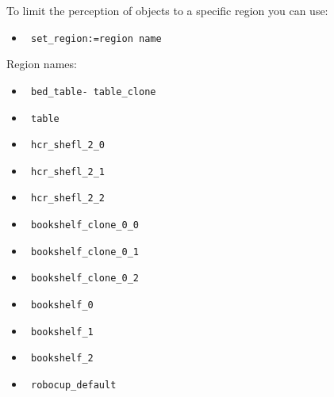 \documentclass[main.tex]{subfiles}
\begin{document}
To limit the perception of objects to a specific region you can use:\\
\begin{itemize}
\item \begin{verbatim} set_region:=region name \end{verbatim} 
\end{itemize}
Region names:\\
\begin{itemize}
\item \begin{verbatim} bed_table- table_clone \end{verbatim} 
\item \begin{verbatim} table \end{verbatim} 
\item \begin{verbatim} hcr_shefl_2_0 \end{verbatim} 
\item \begin{verbatim} hcr_shefl_2_1 \end{verbatim}
\item \begin{verbatim} hcr_shefl_2_2 \end{verbatim}
\item \begin{verbatim} bookshelf_clone_0_0 \end{verbatim} 
\item \begin{verbatim} bookshelf_clone_0_1 \end{verbatim} 
\item \begin{verbatim} bookshelf_clone_0_2 \end{verbatim} 
\item \begin{verbatim} bookshelf_0 \end{verbatim} 
\item \begin{verbatim} bookshelf_1 \end{verbatim} 
\item \begin{verbatim} bookshelf_2 \end{verbatim} 
\item \begin{verbatim} robocup_default \end{verbatim} 
\end{itemize}
\end{document}
